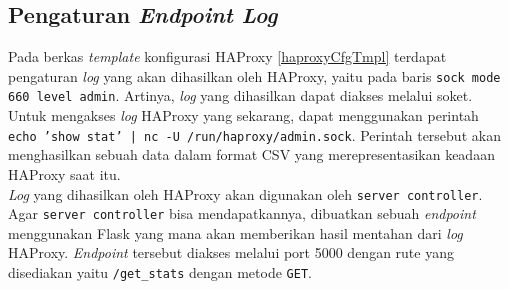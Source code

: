         \subsection{Pengaturan \textit{Endpoint Log}}
        	Pada berkas \textit{template} konfigurasi HAProxy \ref{haproxyCfgTmpl} terdapat pengaturan \textit{log} yang akan dihasilkan oleh HAProxy, yaitu pada baris \texttt{sock mode 660 level admin}. Artinya, \textit{log} yang dihasilkan dapat diakses melalui soket. Untuk mengakses \textit{log} HAProxy yang sekarang, dapat menggunakan perintah \texttt{echo 'show stat' | nc -U /run/haproxy/admin.sock}. Perintah tersebut akan menghasilkan sebuah data dalam format CSV yang merepresentasikan keadaan HAProxy saat itu.\\
            \indent \textit{Log} yang dihasilkan oleh HAProxy akan digunakan oleh \texttt{server controller}. Agar \texttt{server controller} bisa mendapatkannya, dibuatkan sebuah \textit{endpoint} menggunakan Flask yang mana akan memberikan hasil mentahan dari \textit{log} HAProxy. \textit{Endpoint} tersebut diakses melalui port 5000 dengan rute yang disediakan yaitu \texttt{/get\_stats} dengan metode \texttt{GET}.
            
